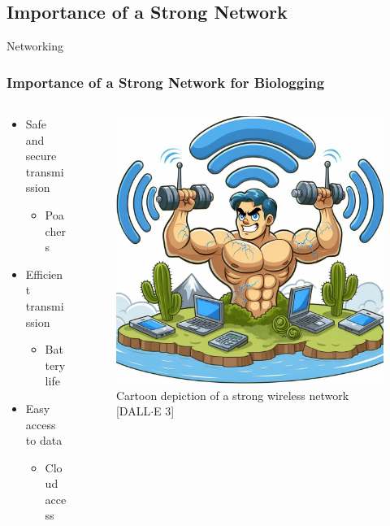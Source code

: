 \documentclass{beamer}
\begin{document}
\subsection{Importance of a Strong Network}
  \begin{frame}{Networking}
    \frametitle{Importance of a Strong Network for Biologging}
    \begin{columns}
      \begin{column}{0.5\textwidth}
        \begin{itemize}
          \item Safe and secure transmission
          \begin{itemize}
            \item Poachers
          \end{itemize}
          \item Efficient transmission
          \begin{itemize}
            \item Battery life
          \end{itemize}
          \item Easy access to data
          \begin{itemize}
            \item Cloud access
          \end{itemize}
        \end{itemize}
      \end{column}
      \begin{column}{0.5\textwidth}
        \begin{figure}[htbp]
          \centering
          \includegraphics[width=.9\textwidth]{StrongNetwork.jpg}
          \caption{Cartoon depiction of a strong wireless network [DALL$\cdot$E 3]}
          \label{fig:Strong_wireless_network}
        \end{figure}
      \end{column}
    \end{columns}
  \end{frame}
\end{document}
